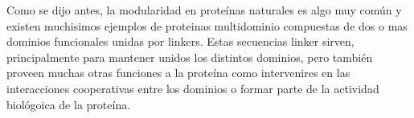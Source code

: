 Como se dijo antes, la modularidad en proteínas naturales es algo muy común y existen muchisimos ejemplos de proteinas multidominio compuestas de dos o mas dominios funcionales unidas por linkers.
Estas secuencias linker sirven, principalmente para mantener unidos los distintos dominios, pero también proveen muchas otras funciones a la proteína como intervenires en las interacciones cooperativas entre los dominios o formar parte de la actividad biológoica de la proteína.
% 

